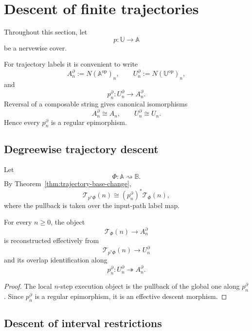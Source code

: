 \section{Descent of finite trajectories}
\label{sec:descent-finite-trajectories}

Throughout this section, let
\[
    p:\mathbb U\to\mathbb A
\]
be a nervewise cover.

For trajectory labels it is convenient to write
\[
    A_n^\partial
    :=
    N(\mathbb A^{\mathrm{op}})_n,
    \qquad
    U_n^\partial
    :=
    N(\mathbb U^{\mathrm{op}})_n,
\]
and
\[
    p_n^\partial:
    U_n^\partial\to A_n^\partial.
\]
Reversal of a composable string gives canonical isomorphisms
\[
    A_n^\partial\cong A_n,
    \qquad
    U_n^\partial\cong U_n.
\]
Hence every \(p_n^\partial\) is a regular epimorphism.

\subsection{Degreewise trajectory descent}
\label{subsec:degreewise-trajectory-descent}

Let
\[
    \Phi:\mathbb A\rightsquigarrow\mathbb B.
\]
By
Theorem~\ref{thm:trajectory-base-change},
\[
    \mathscr T_{p^\ast\Phi}(n)
    \cong
    (p_n^\partial)^\ast
    \mathscr T_\Phi(n),
\]
where the pullback is taken over the input-path label map.

\begin{proposition}
\label{prop:effective-descent-n-step-executions}
For every \(n\geq0\), the object
\[
    \mathscr T_\Phi(n)
    \to
    A_n^\partial
\]
is reconstructed effectively from
\[
    \mathscr T_{p^\ast\Phi}(n)
    \to
    U_n^\partial
\]
and its overlap identification along
\[
    p_n^\partial:
    U_n^\partial\twoheadrightarrow A_n^\partial.
\]
\end{proposition}

\begin{proof}
The local \(n\)-step execution object is the pullback of the global one along
\(p_n^\partial\). Since \(p_n^\partial\) is a regular epimorphism, it is an
effective descent morphism.
\end{proof}

\subsection{Descent of interval restrictions}
\label{subsec:descent-interval-restrictions}

